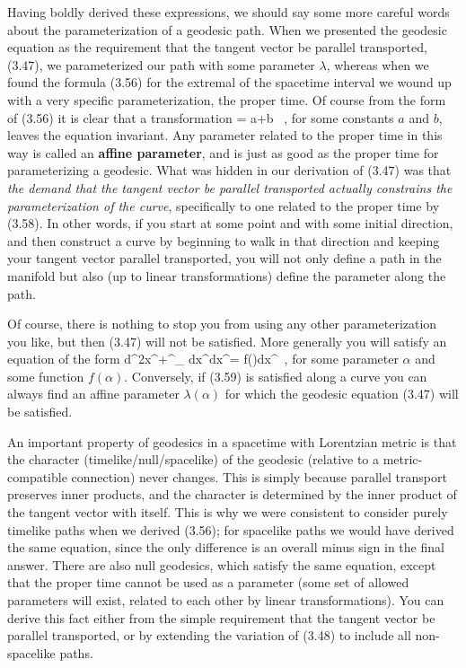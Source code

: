 Having boldly derived these expressions, we should say some more 
careful words about the parameterization of a geodesic path.
When we presented the geodesic equation as the requirement that
the tangent vector be parallel transported, (3.47), we parameterized
our path with some parameter $\lambda$, whereas when we found 
the formula (3.56) for the extremal of the spacetime interval we wound
up with a very specific parameterization, the proper time.  Of course
from the form of (3.56) it is clear that a transformation 
\be
  \tau \rightarrow \lambda = a\tau +b \ ,\label{3.58}
\ee
for some constants $a$ and $b$, leaves the equation invariant.  Any
parameter related to the proper time in this way is called an
{\bf affine parameter}, and is just as good as the proper time
for parameterizing a geodesic.  What was hidden in our derivation
of (3.47) was that {\it the demand that the tangent vector be parallel
transported actually constrains the parameterization of the curve},
specifically to one related to the proper time by (3.58).  In other
words, if you start at some point and with some initial direction,
and then construct a curve by beginning to walk in that direction
and keeping your tangent vector parallel transported, you will not
only define a path in the manifold but also (up to linear transformations)
define the parameter along the path.

Of course, there is nothing to stop you from using any other 
parameterization you like, but then (3.47) will not be satisfied.
More generally you will satisfy an equation of the form
\be
  {{d^2x^\mu}}+\Gamma^\mu_{\rho\sigma}
  {{dx^\rho}}{{dx^\sigma}}=
  f(\alpha){{dx^\mu}}\ ,\label{3.59}
\ee
for some parameter $\alpha$ and some function $f(\alpha)$.
Conversely, if (3.59) is satisfied along a curve you can always find
an affine parameter $\lambda(\alpha)$ for which the geodesic equation
(3.47) will be satisfied.

An important property of geodesics in a spacetime with Lorentzian
metric is that the character (timelike/null/spacelike) of the
geodesic (relative to a metric-compatible connection) never changes.  
This is simply because parallel transport preserves inner products,
and the character is determined by the inner product of the tangent
vector with itself.  This is why we were consistent to consider
purely timelike paths when we derived (3.56); for spacelike paths
we would have derived the same equation, since the only difference
is an overall minus sign in the final answer.  There are also null
geodesics, which satisfy the same equation, except that the proper
time cannot be used as a parameter (some set of allowed parameters
will exist, related to each other by linear transformations).  You
can derive this fact either from the simple requirement that the
tangent vector be parallel transported, or by extending the variation
of (3.48) to include all non-spacelike paths.

